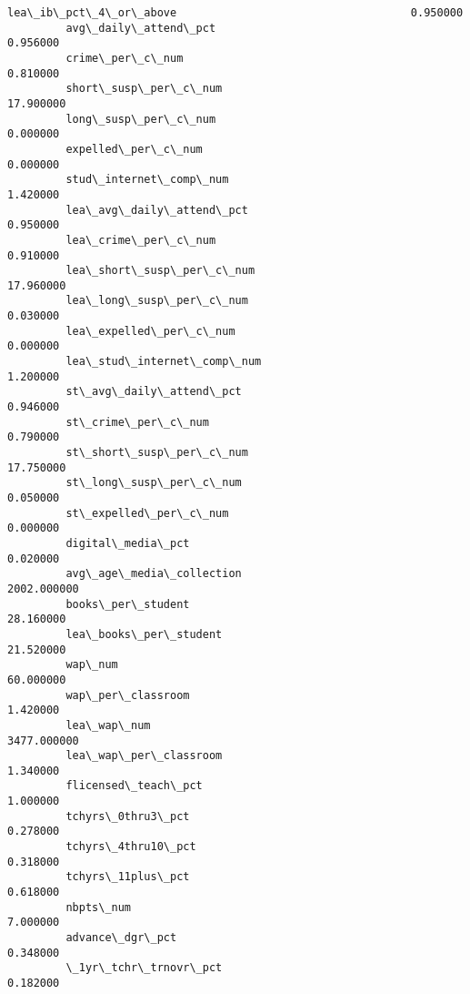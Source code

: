 \documentclass[11pt]{article}
\begin{document}
\begin{Verbatim}[commandchars=\\\{\}]
         lea\_ib\_pct\_4\_or\_above                                    0.950000   
         avg\_daily\_attend\_pct                                     0.956000   
         crime\_per\_c\_num                                          0.810000   
         short\_susp\_per\_c\_num                                    17.900000   
         long\_susp\_per\_c\_num                                      0.000000   
         expelled\_per\_c\_num                                       0.000000   
         stud\_internet\_comp\_num                                   1.420000   
         lea\_avg\_daily\_attend\_pct                                 0.950000   
         lea\_crime\_per\_c\_num                                      0.910000   
         lea\_short\_susp\_per\_c\_num                                17.960000   
         lea\_long\_susp\_per\_c\_num                                  0.030000   
         lea\_expelled\_per\_c\_num                                   0.000000   
         lea\_stud\_internet\_comp\_num                               1.200000   
         st\_avg\_daily\_attend\_pct                                  0.946000   
         st\_crime\_per\_c\_num                                       0.790000   
         st\_short\_susp\_per\_c\_num                                 17.750000   
         st\_long\_susp\_per\_c\_num                                   0.050000   
         st\_expelled\_per\_c\_num                                    0.000000   
         digital\_media\_pct                                        0.020000   
         avg\_age\_media\_collection                              2002.000000   
         books\_per\_student                                       28.160000   
         lea\_books\_per\_student                                   21.520000   
         wap\_num                                                 60.000000   
         wap\_per\_classroom                                        1.420000   
         lea\_wap\_num                                           3477.000000   
         lea\_wap\_per\_classroom                                    1.340000   
         flicensed\_teach\_pct                                      1.000000   
         tchyrs\_0thru3\_pct                                        0.278000   
         tchyrs\_4thru10\_pct                                       0.318000   
         tchyrs\_11plus\_pct                                        0.618000   
         nbpts\_num                                                7.000000   
         advance\_dgr\_pct                                          0.348000   
         \_1yr\_tchr\_trnovr\_pct                                     0.182000   

\end{Verbatim}
\end{document}
